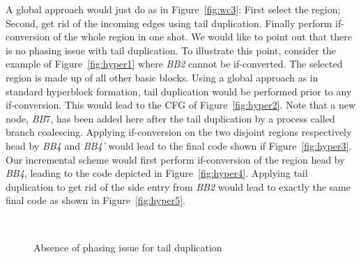 A global approach would just do as in Figure~\ref{fig:wc3}: 
First select the region; 
Second, get rid of the incoming edges using tail duplication.
Finally perform if-conversion of the whole region in one shot. 
We would like to point out that there is no phasing issue with tail duplication. 
To illustrate this point, consider the example of Figure~\ref{fig:hyper1} where \textit{BB2} cannot be if-converted. 
The selected region is made up of all other basic blocks. 
Using a global approach as in standard hyperblock formation, tail duplication would be performed prior to any if-conversion. 
This would lead to the CFG of Figure~\ref{fig:hyper2}. 
Note that a new node, \textit{BB}7, has been added here after the tail duplication by a process called branch coalescing. 
Applying if-conversion on the two disjoint regions respectively head by \textit{BB4} and \textit{BB4'} would lead to the final code shown if Figure~\ref{fig:hyper3}. 
Our incremental scheme would first perform if-conversion of the region head by \textit{BB4}, leading to the code depicted in Figure~\ref{fig:hyper4}. 
Applying tail duplication to get rid of the side entry from \textit{BB2} would lead to exactly the same final code as shown in Figure~\ref{fig:hyper5}.

\begin{figure}[h]
  \hfill
  \hfill
  \\
  \hfill
  \hfill
 \caption{Absence of phasing issue for tail duplication\label{fig:hyper}}
\end{figure}


